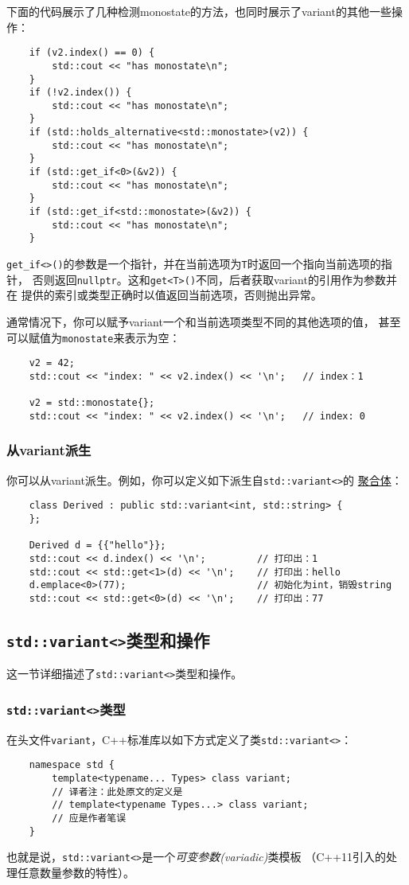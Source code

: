 下面的代码展示了几种检测monostate的方法，也同时展示了variant的其他一些操作：
\begin{lstlisting}
    if (v2.index() == 0) {
        std::cout << "has monostate\n";
    }
    if (!v2.index()) {
        std::cout << "has monostate\n";
    }
    if (std::holds_alternative<std::monostate>(v2)) {
        std::cout << "has monostate\n";
    }
    if (std::get_if<0>(&v2)) {
        std::cout << "has monostate\n";
    }
    if (std::get_if<std::monostate>(&v2)) {
        std::cout << "has monostate\n";
    }
\end{lstlisting}
\texttt{get\_if<>()}的参数是一个指针，并在当前选项为\texttt{T}时返回一个指向当前选项的指针，
否则返回\texttt{nullptr}。这和\texttt{get<T>()}不同，后者获取variant的引用作为参数并在
提供的索引或类型正确时以值返回当前选项，否则抛出异常。

通常情况下，你可以赋予variant一个和当前选项类型不同的其他选项的值，
甚至可以赋值为\texttt{monostate}来表示为空：
\begin{lstlisting}
    v2 = 42;
    std::cout << "index: " << v2.index() << '\n';   // index：1

    v2 = std::monostate{};
    std::cout << "index: " << v2.index() << '\n';   // index: 0
\end{lstlisting}

\subsubsection*{从variant派生}
你可以从variant派生。例如，你可以定义如下派生自\texttt{std::variant<>}的
\hyperref[ch4]{聚合体}：
\begin{lstlisting}
    class Derived : public std::variant<int, std::string> {
    };

    Derived d = {{"hello"}};
    std::cout << d.index() << '\n';         // 打印出：1
    std::cout << std::get<1>(d) << '\n';    // 打印出：hello
    d.emplace<0>(77);                       // 初始化为int，销毁string
    std::cout << std::get<0>(d) << '\n';    // 打印出：77
\end{lstlisting}

\subsection{\texttt{std::variant<>}类型和操作}
这一节详细描述了\texttt{std::variant<>}类型和操作。

\subsubsection{\texttt{std::variant<>}类型}
在头文件\texttt{variant}，C++标准库以如下方式定义了类\texttt{std::variant<>}：
\begin{lstlisting}
    namespace std {
        template<typename... Types> class variant;
        // 译者注：此处原文的定义是
        // template<typename Types...> class variant;
        // 应是作者笔误
    }
\end{lstlisting}
也就是说，\texttt{std::variant<>}是一个\emph{可变参数(variadic)}类模板
（C++11引入的处理任意数量参数的特性）。

